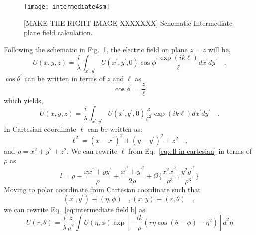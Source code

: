 \begin{figure}[t!]
  \centering
  \texttt{[image: intermediate4sm]}
  \caption{[MAKE THE RIGHT IMAGE XXXXXXX] Schematic Intermediate-plane field calculation.}
  \label{fig:intermediate field schema}
\end{figure}
Following the schematic in Fig.~\ref{fig:intermediate field schema}, 
the electric field on plane $z=z$ will be,
\begin{equation}
\label{eq:intermediate field a}
U(x,y,z) = \frac{i}{\lambda}\int _{x^{\prime},y^{\prime}}U(x^{\prime},y^{\prime},0)
					\cos \phi ^{\prime} \frac{\exp 
					\left( ik\ell \right)}{\ell}dx^{\prime}dy^{\prime} \quad .
\end{equation}
$\cos\theta^{\prime}$ can be written in terms of $z$ and $\ell$ as 
\begin{equation}
\cos \phi ^{\prime} = \frac{z}{\ell}
\end{equation}
which yields,
\begin{equation}
\label{eq:intermediate field b}
U(x,y,z) = \frac{i}{\lambda}\int _{x^{\prime},y^{\prime}}U(x^{\prime},y^{\prime},0)
					\frac{z}{\ell ^2} \exp 
					\left( ik\ell \right)dx^{\prime}dy^{\prime} \quad .
\end{equation}
In Cartesian coordinate $\ell$ can be written as:
\begin{equation}
\label{eq:ell in cartesian}
\ell ^2 = (x-x^{\prime})^{2} + (y-y^{\prime})^{2} + z^{2} \quad ,
\end{equation}
and $\rho = x^2 + y^2 + z^2$. We can rewrite $\ell$ from 
Eq.~\eqref{eq:ell in cartesian} in terms of $\rho$ as 
\begin{equation}
\label{eq:ell in r}
l = \rho - \frac{xx^{\prime}+yy^{\prime}}{\rho} + \frac{x^{\prime^{2}} + y^{\prime^{2}}}{2\rho}
			+ \mathcal{O}\lbrace \frac{x^2x^{\prime ^{2}}}{\rho ^3},\frac{y^2y^{\prime ^{2}}}{\rho ^3} \rbrace
\end{equation}
Moving to polar coordinate from Cartesian coordinate such that
\begin{subequations}
\begin{equation}
\left( x^{\prime},y^{\prime}\right) \equiv \left( \eta , \phi \right) \quad ,
\end{equation}
\begin{equation}
 \left( x,y\right) \equiv \left(r , \theta \right) \quad ,
\end{equation}
\end{subequations}
we can rewrite Eq.~\eqref{eq:intermediate field b} as
\begin{equation}
\label{eq:intermediate field c}
U(r ,\theta) = \frac{i}{\lambda} \frac{z}{\rho ^2}\int U(\eta ,\phi)\exp \left[ -\frac{ik}{\rho}\left( r \eta \cos (\theta - \phi) - \eta ^2 \right)\right]d^2\eta
\end{equation}
